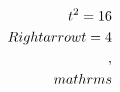 \documentclass[preview]{standalone}
\begin{document}
\begin{align*}
\special{dvisvgm:raw <g id='unique000'>}t^2 = 16 \\Rightarrow t = 4\\,\\mathrm{s}\special{dvisvgm:raw </g>}
\end{align*}
\end{document}

